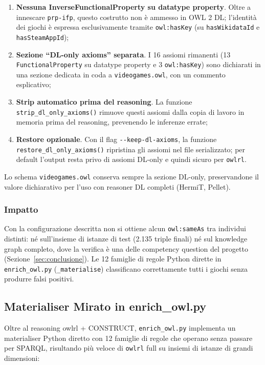 \begingroup\sloppy
\begin{enumerate}[nosep]
  \item \textbf{Nessuna InverseFunctionalProperty su datatype property}. Oltre a
    innescare \texttt{prp-ifp}, questo costrutto non \`e ammesso in OWL 2 DL;
    l'identit\`a dei giochi \`e espressa esclusivamente tramite
    \texttt{owl:hasKey} (su \texttt{hasWikidataId} e \texttt{hasSteamAppId});
  \item \textbf{Sezione ``DL-only axioms'' separata}. I 16 assiomi rimanenti
    (13 \texttt{FunctionalProperty} su datatype property e 3 \texttt{owl:hasKey})
    sono dichiarati in una sezione dedicata in coda a \texttt{videogames.owl},
    con un commento esplicativo;
  \item \textbf{Strip automatico prima del reasoning}. La funzione
    \texttt{strip\_dl\_only\_axioms()} rimuove questi assiomi dalla copia di
    lavoro in memoria prima del reasoning, prevenendo le inferenze errate;
  \item \textbf{Restore opzionale}. Con il flag \texttt{-{}-keep-dl-axioms}, la
    funzione \texttt{restore\_dl\_only\_axioms()} ripristina gli assiomi nel file
    serializzato; per default l'output resta privo di assiomi DL-only e quindi
    sicuro per \texttt{owlrl}.
\end{enumerate}
\endgroup

Lo schema \texttt{videogames.owl} conserva sempre la sezione DL-only, preservandone
il valore dichiarativo per l'uso con reasoner DL completi (HermiT, Pellet).

\subsubsection{Impatto}

Con la configurazione descritta non si ottiene alcun \texttt{owl:sameAs} tra individui distinti: n\'e
sull'insieme di istanze di test (2.135 triple finali) n\'e sul knowledge graph completo, dove la
verifica \`e una delle competency question del progetto (Sezione~\ref{sec:conclusione}). Le 12 famiglie di regole Python dirette in
\texttt{enrich\_owl.py} (\texttt{\_materialise}) classificano correttamente tutti
i giochi senza produrre falsi positivi.

\subsection{Materialiser Mirato in enrich\_owl.py}

Oltre al reasoning owlrl + CONSTRUCT, \texttt{enrich\_owl.py} implementa un
materialiser Python diretto con 12 famiglie di regole che operano senza passare
per SPARQL, risultando pi\`u veloce di \texttt{owlrl} full su insiemi di istanze di grandi
dimensioni:

